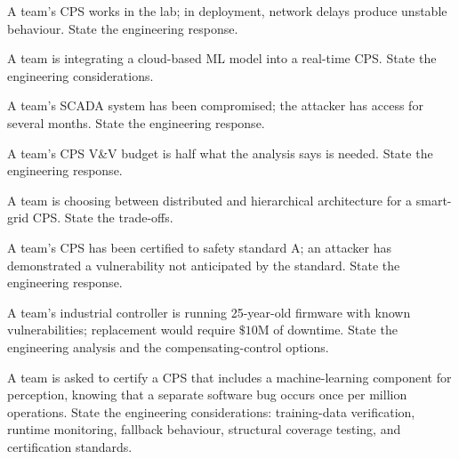 \begin{exercise}
A team's CPS works in the lab; in deployment, network delays produce unstable behaviour. State the engineering response.
\end{exercise}

\begin{exercise}
A team is integrating a cloud-based ML model into a real-time CPS. State the engineering considerations.
\end{exercise}

\begin{exercise}
A team's SCADA system has been compromised; the attacker has access for several months. State the engineering response.
\end{exercise}

\begin{exercise}
A team's CPS V\&V budget is half what the analysis says is needed. State the engineering response.
\end{exercise}

\begin{exercise}
A team is choosing between distributed and hierarchical architecture for a smart-grid CPS. State the trade-offs.
\end{exercise}

\begin{exercise}
A team's CPS has been certified to safety standard A; an attacker has demonstrated a vulnerability not anticipated by the standard. State the engineering response.
\end{exercise}

\begin{exercise}
A team's industrial controller is running 25-year-old firmware with known vulnerabilities; replacement would require $\$10\text{M}$ of downtime. State the engineering analysis and the compensating-control options.
\end{exercise}

\begin{exercise}
A team is asked to certify a CPS that includes a machine-learning component for perception, knowing that a separate software bug occurs once per million operations. State the engineering considerations: training-data verification, runtime monitoring, fallback behaviour, structural coverage testing, and certification standards.
\end{exercise}
